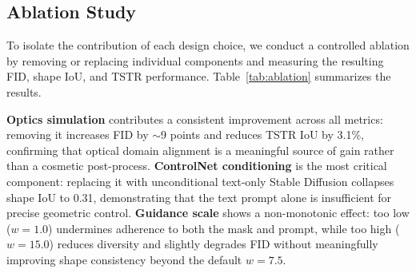 \subsection{Ablation Study}

To isolate the contribution of each design choice, we conduct a controlled ablation by removing or replacing individual components and measuring the resulting FID, shape IoU, and TSTR performance. Table~\ref{tab:ablation} summarizes the results.

\begin{table}[htbp]
    \centering
    \caption{Ablation study: contribution of individual components.}
    \label{tab:ablation}
\end{table}

\textbf{Optics simulation} contributes a consistent improvement across all metrics: removing it increases FID by $\sim$9 points and reduces TSTR IoU by 3.1\%, confirming that optical domain alignment is a meaningful source of gain rather than a cosmetic post-process. \textbf{ControlNet conditioning} is the most critical component: replacing it with unconditional text-only Stable Diffusion collapses shape IoU to 0.31, demonstrating that the text prompt alone is insufficient for precise geometric control. \textbf{Guidance scale} shows a non-monotonic effect: too low ($w=1.0$) undermines adherence to both the mask and prompt, while too high ($w=15.0$) reduces diversity and slightly degrades FID without meaningfully improving shape consistency beyond the default $w=7.5$.
